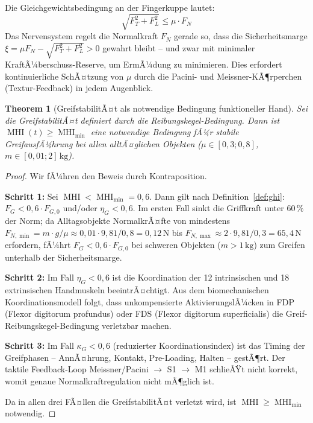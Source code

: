 ﻿\documentclass[12pt,a4paper]{report}
\theoremstyle{plain}
\newtheorem{theorem}{Theorem}[section]
\theoremstyle{definition}
\theoremstyle{remark}
\DeclareMathOperator{\MHI}{MHI}
\begin{document}
Die Gleichgewichtsbedingung an der Fingerkuppe lautet:
\[
  \sqrt{F_T^2 + F_L^2} \leq \mu \cdot F_N
\]
Das Nervensystem regelt die Normalkraft $F_N$ gerade so, dass
die Sicherheitsmarge $\xi = \mu F_N - \sqrt{F_T^2 + F_L^2} > 0$ gewahrt
bleibt -- und zwar mit minimaler KraftÃ¼berschuss-Reserve, um ErmÃ¼dung
zu minimieren. Dies erfordert kontinuierliche SchÃ¤tzung von $\mu$ durch
die Pacini- und Meissner-KÃ¶rperchen (Textur-Feedback) in jedem Augenblick.

\begin{theorem}[GreifstabilitÃ¤t als notwendige Bedingung funktioneller Hand]
\label{thm:greif}
Sei die GreifstabilitÃ¤t definiert durch die Reibungskegel-Bedingung.
Dann ist $\MHI(t) \geq \MHI_{\min}$ eine notwendige Bedingung fÃ¼r
stabile GreifausfÃ¼hrung bei allen alltÃ¤glichen Objekten
($\mu \in [0{,}3; 0{,}8]$, $m \in [0{,}01; 2]\,\text{kg}$).
\end{theorem}

\begin{proof}
Wir fÃ¼hren den Beweis durch Kontraposition.

\textbf{Schritt 1:} Sei $\MHI < \MHI_{\min} = 0{,}6$. Dann gilt nach
Definition~\ref{def:ghi}: $F_G < 0{,}6 \cdot F_{G,0}$ und/oder
$\eta_G < 0{,}6$. Im ersten Fall sinkt die Griffkraft unter $60\,\%$
der Norm; da Alltagsobjekte NormalkrÃ¤fte von mindestens
$F_{N,\min} = m \cdot g / \mu \approx 0{,}01 \cdot 9{,}81 / 0{,}8 = 0{,}12\,\text{N}$
bis $F_{N,\max} \approx 2 \cdot 9{,}81 / 0{,}3 = 65{,}4\,\text{N}$ erfordern,
fÃ¼hrt $F_G < 0{,}6 \cdot F_{G,0}$ bei schweren Objekten ($m > 1\,\text{kg}$)
zum Greifen unterhalb der Sicherheitsmarge.

\textbf{Schritt 2:} Im Fall $\eta_G < 0{,}6$ ist die Koordination der
12 intrinsischen und 18 extrinsischen Handmuskeln beeintrÃ¤chtigt.
Aus dem biomechanischen Koordinationsmodell \cite{an1985} folgt, dass
unkompensierte AktivierungslÃ¼cken in FDP (Flexor digitorum profundus)
oder FDS (Flexor digitorum superficialis) die Greif-Reibungskegel-Bedingung
verletzbar machen.

\textbf{Schritt 3:} Im Fall $\kappa_G < 0{,}6$ (reduzierter Koordinationsindex)
ist das Timing der Greifphasen -- AnnÃ¤hrung, Kontakt, Pre-Loading, Halten --
gestÃ¶rt. Der taktile Feedback-Loop Meissner/Pacini $\to$ S1 $\to$ M1 schlieÃŸt
nicht korrekt, womit genaue Normalkraftregulation nicht mÃ¶glich ist.

Da in allen drei FÃ¤llen die GreifstabilitÃ¤t verletzt wird, ist
$\MHI \geq \MHI_{\min}$ notwendig.
\end{proof}
\end{document}
